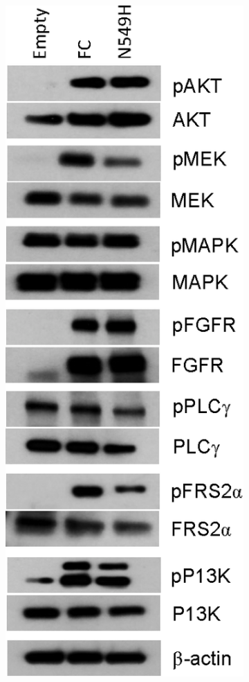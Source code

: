\begin{figure}[htbp]
\begin{minipage}[t]{0.22\textwidth}
\begin{subfigure}{\textwidth}
            \includegraphics[width=\textwidth,keepaspectratio]{images/240/fusion_downstream_western}

\end{subfigure}
\end{minipage}
\end{figure}

